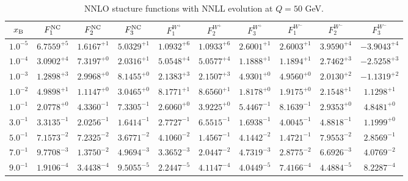 \begin{table}[h]
\begin{adjustbox}{width=\textwidth}
\begin{tabular}{|c||c|c|c|c|c|c|c|c|c|}
\hline
$x_{\rm B}$ & $F_1^{\rm NC}$ & $F_2^{\rm NC}$ & $F_3^{\rm NC}$ & $F_1^{W^+}$ & $F_2^{W^+}$ & $F_3^{W^+}$ & $F_1^{W^-}$ & $F_2^{W^-}$ & $F_3^{W^-}$ \\
\hline
$ 1.0^{-5}$ & $ 6.7559^{+5}$ & $ 1.6167^{+1}$ & $ 5.0329^{+1}$ & $ 1.0932^{+6}$ & $ 1.0933^{+6}$ & $ 2.6001^{+1}$ & $ 2.6003^{+1}$ & $ 3.9590^{+4}$ & $-3.9043^{+4}$ \\
$ 1.0^{-4}$ & $ 3.0902^{+4}$ & $ 7.3197^{+0}$ & $ 2.0316^{+1}$ & $ 5.0548^{+4}$ & $ 5.0577^{+4}$ & $ 1.1888^{+1}$ & $ 1.1894^{+1}$ & $ 2.7462^{+3}$ & $-2.5258^{+3}$ \\
$ 1.0^{-3}$ & $ 1.2898^{+3}$ & $ 2.9968^{+0}$ & $ 8.1455^{+0}$ & $ 2.1383^{+3}$ & $ 2.1507^{+3}$ & $ 4.9301^{+0}$ & $ 4.9560^{+0}$ & $ 2.0130^{+2}$ & $-1.1319^{+2}$ \\
$ 1.0^{-2}$ & $ 4.9898^{+1}$ & $ 1.1147^{+0}$ & $ 3.0465^{+0}$ & $ 8.1771^{+1}$ & $ 8.6560^{+1}$ & $ 1.8178^{+0}$ & $ 1.9175^{+0}$ & $ 2.1548^{+1}$ & $ 1.1298^{+1}$ \\
$ 1.0^{-1}$ & $ 2.0778^{+0}$ & $ 4.3360^{-1}$ & $ 7.3305^{-1}$ & $ 2.6060^{+0}$ & $ 3.9225^{+0}$ & $ 5.4467^{-1}$ & $ 8.1639^{-1}$ & $ 2.9353^{+0}$ & $ 4.8481^{+0}$ \\
$ 3.0^{-1}$ & $ 3.3135^{-1}$ & $ 2.0256^{-1}$ & $ 1.6414^{-1}$ & $ 2.7727^{-1}$ & $ 6.5515^{-1}$ & $ 1.6938^{-1}$ & $ 4.0045^{-1}$ & $ 4.8818^{-1}$ & $ 1.1999^{+0}$ \\
$ 5.0^{-1}$ & $ 7.1573^{-2}$ & $ 7.2325^{-2}$ & $ 3.6771^{-2}$ & $ 4.1060^{-2}$ & $ 1.4567^{-1}$ & $ 4.1442^{-2}$ & $ 1.4721^{-1}$ & $ 7.9553^{-2}$ & $ 2.8569^{-1}$ \\
$ 7.0^{-1}$ & $ 9.7708^{-3}$ & $ 1.3750^{-2}$ & $ 4.9694^{-3}$ & $ 3.3652^{-3}$ & $ 2.0447^{-2}$ & $ 4.7319^{-3}$ & $ 2.8775^{-2}$ & $ 6.6926^{-3}$ & $ 4.0769^{-2}$ \\
$ 9.0^{-1}$ & $ 1.9106^{-4}$ & $ 3.4438^{-4}$ & $ 9.5055^{-5}$ & $ 2.2447^{-5}$ & $ 4.1147^{-4}$ & $ 4.0449^{-5}$ & $ 7.4166^{-4}$ & $ 4.4884^{-5}$ & $ 8.2287^{-4}$ \\
\hline
\end{tabular}
\end{adjustbox}\caption{NNLO stucture functions with NNLL evolution at $Q = 50$ GeV.}
\label{tab:N2LO-Q50}
\end{table}


